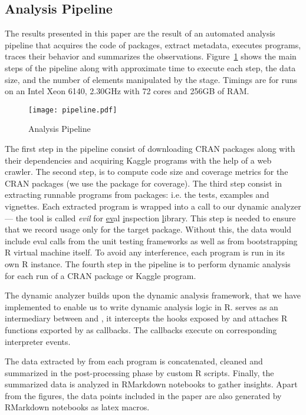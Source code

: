 \documentclass[USenglish,cleveref, autoref, thm-restate]{lipics-v2019}
\begin{document}
\subsection{Analysis Pipeline}

The results presented in this paper are the result of an automated
analysis pipeline that acquires the code of packages, extract
metadata, executes programs, traces their behavior and summarizes the
observations. Figure~\ref{fig:pipeline} shows the main steps of the
pipeline along with approximate time to execute each step, the data
size, and the number of elements manipulated by the stage. Timings are
for runs on an Intel Xeon 6140, 2.30GHz with 72 cores and 256GB of
RAM.

\begin{figure}[!h]\hspace{-5mm}
  \texttt{[image: pipeline.pdf]}
  \caption{Analysis Pipeline}\label{fig:pipeline}
\end{figure}

The first step in the pipeline consist of downloading CRAN packages
along with their dependencies and acquiring Kaggle programs with the
help of a web crawler. The second step, is to compute code size and
coverage metrics for the CRAN packages (we use the \covr package for
coverage). The third step consist in extracting runnable programs from
packages: i.e. the tests, examples and vignettes. Each extracted
program is wrapped into a call to our dynamic analyzer --- the tool is
called \emph{evil} for \underline{ev}al \underline{i}nspection
\underline{l}ibrary. This step is needed to ensure that we record
\eval usage only for the target package. Without this, the data would
include eval calls from the unit testing frameworks as well as from
bootstrapping R virtual machine itself. To avoid any interference,
each program is run in its own R instance.
The fourth step in the pipeline is to perform dynamic analysis for
each run of a CRAN package or Kaggle program.

The dynamic analyzer builds upon the dynamic analysis framework,
\instrumentr that we have implemented to enable us to write dynamic
analysis logic in R. \instrumentr serves as an intermediary between
\rdyntrace and \evil, it intercepts the hooks exposed by \rdyntrace
and attaches R functions exported by \evil as callbacks. The \evil
callbacks execute on corresponding interpreter events.


The data extracted by \evil from each program is
concatenated, cleaned and summarized in the post-processing phase by
custom R scripts. Finally, the summarized data is analyzed in
RMarkdown notebooks to gather insights. Apart from the figures, the
data points included in the paper are also generated by RMarkdown
notebooks as latex macros.
\end{document}
